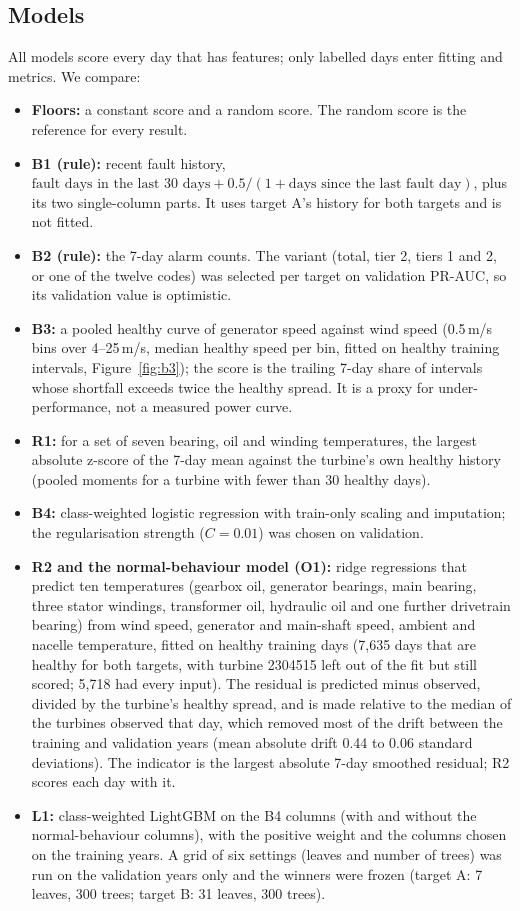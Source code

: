 \documentclass[12pt,a4paper]{article}
\begin{document}
	\subsection{Models}\label{sec:models}
	All models score every day that has features; only labelled days enter fitting and metrics. We compare:
	\begin{itemize}
		\item \textbf{Floors:} a constant score and a random score. The random score is the reference for every result.
		\item \textbf{B1 (rule):} recent fault history, $\text{fault days in the last 30 days} + 0.5/(1+\text{days since the last fault day})$, plus its two single-column parts. It uses target A's history for both targets and is not fitted.
		\item \textbf{B2 (rule):} the 7-day alarm counts. The variant (total, tier 2, tiers 1 and 2, or one of the twelve codes) was selected per target on validation PR-AUC, so its validation value is optimistic.
		\item \textbf{B3:} a pooled healthy curve of generator speed against wind speed (0.5\,m/s bins over 4--25\,m/s, median healthy speed per bin, fitted on healthy training intervals, Figure~\ref{fig:b3}); the score is the trailing 7-day share of intervals whose shortfall exceeds twice the healthy spread. It is a proxy for under-performance, not a measured power curve.
		\item \textbf{R1:} for a set of seven bearing, oil and winding temperatures, the largest absolute z-score of the 7-day mean against the turbine's own healthy history (pooled moments for a turbine with fewer than 30 healthy days).
		\item \textbf{B4:} class-weighted logistic regression with train-only scaling and imputation; the regularisation strength ($C=0.01$) was chosen on validation.
		\item \textbf{R2 and the normal-behaviour model (O1):} ridge regressions that predict ten temperatures (gearbox oil, generator bearings, main bearing, three stator windings, transformer oil, hydraulic oil and one further drivetrain bearing) from wind speed, generator and main-shaft speed, ambient and nacelle temperature, fitted on healthy training days (7{,}635 days that are healthy for both targets, with turbine 2304515 left out of the fit but still scored; 5{,}718 had every input). The residual is predicted minus observed, divided by the turbine's healthy spread, and is made relative to the median of the turbines observed that day, which removed most of the drift between the training and validation years (mean absolute drift 0.44 to 0.06 standard deviations). The indicator is the largest absolute 7-day smoothed residual; R2 scores each day with it.
		\item \textbf{L1:} class-weighted LightGBM on the B4 columns (with and without the normal-behaviour columns), with the positive weight and the columns chosen on the training years. A grid of six settings (leaves and number of trees) was run on the validation years only and the winners were frozen (target A: 7 leaves, 300 trees; target B: 31 leaves, 300 trees).
	\end{itemize}
\end{document}
